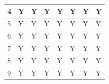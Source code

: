 \begin{table}[H]
\begin{tabular}{|l|l|l|l|l|l|l|l|}
4               & Y                                                              & Y                                                              & Y                                                             & Y                                                              & Y                                                             & Y                                                             & Y                                                             \\ \hline
5               & Y                                                              & Y                                                              & Y                                                             & Y                                                              & Y                                                             & Y                                                             & Y                                                             \\ \hline
6               & Y                                                              & Y                                                              & Y                                                             & Y                                                              & Y                                                             & Y                                                             & Y                                                             \\ \hline
7               & Y                                                              & Y                                                              & Y                                                             & Y                                                              & Y                                                             & Y                                                             & Y                                                             \\ \hline
8               & Y                                                              & Y                                                              & Y                                                             & Y                                                              & Y                                                             & Y                                                             & Y                                                             \\ \hline
9               & Y                                                              & Y                                                              & Y                                                             & Y                                                              & Y                                                             & Y                                                             & Y                                                             \\ \hline

\end{tabular}
\end{table}
